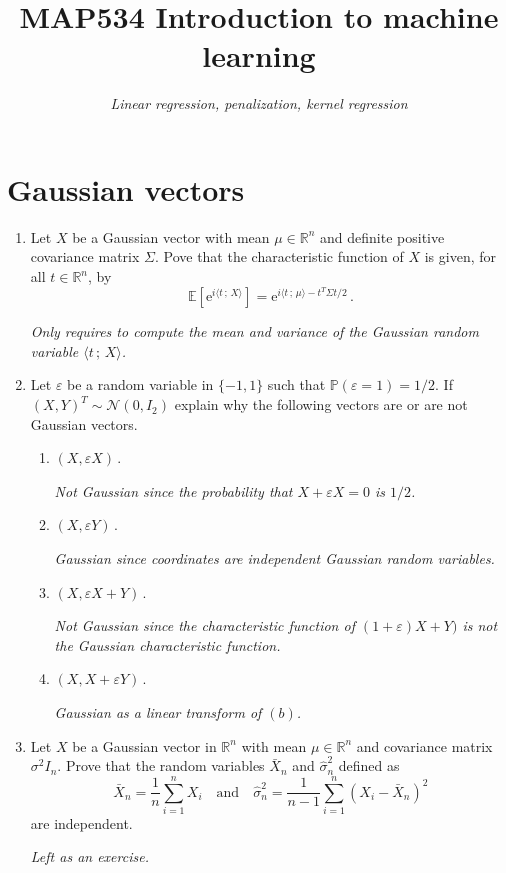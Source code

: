 \documentclass[a4paper,10pt,fleqn]{article}
\title{{\bf MAP534 Introduction to machine learning}}
\author{{\em Linear regression, penalization, kernel regression}}
\date{}
\newcommand{\eqsp}{\,}
\newcommand{\rset}{\ensuremath{\mathbb{R}}}
\newcommand{\bP}{\mathbb{P}}
\newcommand{\rme}{\ensuremath{\mathrm{e}}}
\newcommand{\1}{\ensuremath{\mathbbm{1}}}
\newcommand{\bE}{\mathbb{E}}
\begin{document}
\maketitle




\section*{Gaussian vectors}
\begin{enumerate}
\item Let $X$ be a Gaussian vector with mean $\mu\in\rset^n$ and definite positive covariance matrix $\Sigma$. Pove that the characteristic function of $X$ is given, for all $t\in\rset^n$, by
$$
\bE[\rme^{i\langle t\eqsp;\eqsp X\rangle}] = \rme^{i\langle t\eqsp;\eqsp \mu\rangle - t^T\Sigma t /2}\eqsp.
$$

\vspace{.2cm}

{\em
Only requires to compute the mean and variance of the Gaussian random variable $\langle t\eqsp;\eqsp X\rangle$. 
}


\item Let $\varepsilon$ be a random variable in $\{-1,1\}$ such that $\bP(\varepsilon = 1) = 1/2$. If $(X,Y)^T\sim \mathcal{N}(0,I_2)$ explain why the following vectors are or are not Gaussian vectors.
\begin{enumerate}
\item $(X,\varepsilon X)$\eqsp.

{\em
Not Gaussian since the probability that  $X +\varepsilon X = 0$ is $1/2$.
}

\item $(X,\varepsilon Y)$\eqsp.

{\em
Gaussian since coordinates are independent Gaussian random variables.
}

\item $(X,\varepsilon X + Y)$\eqsp.

{\em
Not Gaussian since the characteristic function of $(1+\varepsilon) X + Y)$ is not the Gaussian characteristic function.
}

\item $(X,X + \varepsilon Y)$\eqsp.

{\em
Gaussian as a linear transform of $(b)$.
}

\end{enumerate}

\item Let $X$ be a Gaussian vector in $\rset^n$ with mean $\mu\in\rset^n$ and covariance matrix $\sigma^2 I_n$. Prove that the random variables $\bar X_n$ and $\widehat \sigma^2_n$ defined as
$$
\bar X_n = \frac{1}{n}\sum_{i=1}^n X_i\quad \mathrm{and} \quad \widehat \sigma^2_n = \frac{1}{n-1}\sum_{i=1}^n (X_i - \bar X_n)^2
$$
are independent.

\vspace{.2cm}

{\em
Left as an exercise.
}
\end{enumerate}
\end{document}
